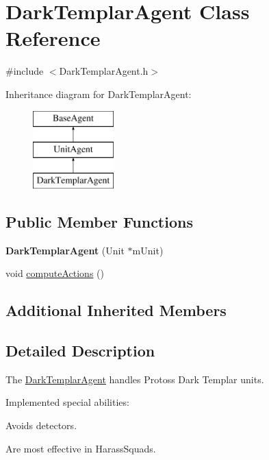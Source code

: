 \hypertarget{class_dark_templar_agent}{\section{Dark\-Templar\-Agent Class Reference}
\label{class_dark_templar_agent}
}


{\ttfamily \#include $<$Dark\-Templar\-Agent.\-h$>$}

Inheritance diagram for Dark\-Templar\-Agent\-:\begin{figure}[H]
\begin{center}
\leavevmode
\includegraphics[height=3.000000cm]{class_dark_templar_agent}
\end{center}
\end{figure}
\subsection*{Public Member Functions}
\begin{DoxyCompactItemize}
\item 
\hypertarget{class_dark_templar_agent_a8408b1b56bd03a3939e609ba1c37b91f}{{\bfseries Dark\-Templar\-Agent} (Unit $\ast$m\-Unit)}\label{class_dark_templar_agent_a8408b1b56bd03a3939e609ba1c37b91f}

\item 
void \hyperlink{class_dark_templar_agent_a390375acf1fa737e7fd9518112607a7a}{compute\-Actions} ()
\end{DoxyCompactItemize}
\subsection*{Additional Inherited Members}


\subsection{Detailed Description}
The \hyperlink{class_dark_templar_agent}{Dark\-Templar\-Agent} handles Protoss Dark Templar units.

Implemented special abilities\-:
\begin{DoxyItemize}
\item Avoids detectors.
\item Are most effective in Harass\-Squads.
\end{DoxyItemize}


